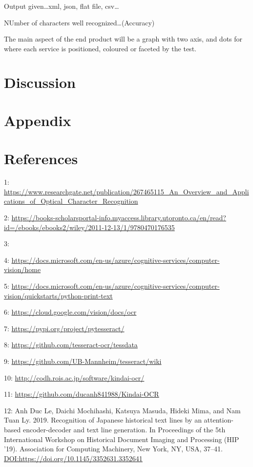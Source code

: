 \documentclass[
]{article}
\begin{document}
Output given\ldots xml, json, flat file, csv\ldots{}

NUmber of characters well recognized\ldots(Accuracy)

The main aspect of the end product will be a graph with two axis, and
dots for where each service is positioned, coloured or faceted by the
test.

\hypertarget{discussion}{%
\section{Discussion}\label{discussion}}

\hypertarget{appendix}{%
\section{Appendix}\label{appendix}}

\hypertarget{references}{%
\section{References}\label{references}}

1:
\url{https://www.researchgate.net/publication/267465115_An_Overview_and_Applications_of_Optical_Character_Recognition}

2:
\url{https://books-scholarsportal-info.myaccess.library.utoronto.ca/en/read?id=/ebooks/ebooks2/wiley/2011-12-13/1/9780470176535}

3:

4:
\url{https://docs.microsoft.com/en-us/azure/cognitive-services/computer-vision/home}

5:
\url{https://docs.microsoft.com/en-us/azure/cognitive-services/computer-vision/quickstarts/python-print-text}

6: \url{https://cloud.google.com/vision/docs/ocr}

7: \url{https://pypi.org/project/pytesseract/}

8: \url{https://github.com/tesseract-ocr/tessdata}

9: \url{https://github.com/UB-Mannheim/tesseract/wiki}

10: \url{http://codh.rois.ac.jp/software/kindai-ocr/}

11: \url{https://github.com/ducanh841988/Kindai-OCR}

12: Anh Duc Le, Daichi Mochihashi, Katsuya Masuda, Hideki Mima, and Nam
Tuan Ly. 2019. Recognition of Japanese historical text lines by an
attention-based encoder-decoder and text line generation. In Proceedings
of the 5th International Workshop on Historical Document Imaging and
Processing (HIP '19). Association for Computing Machinery, New York, NY,
USA, 37--41. \url{DOI:https://doi.org/10.1145/3352631.3352641}
\end{document}
